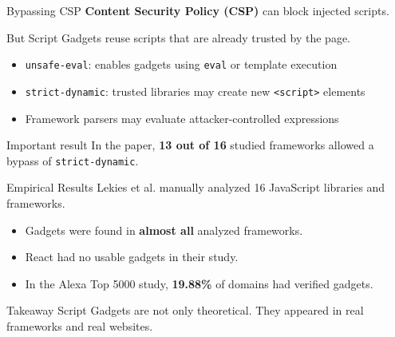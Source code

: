 \documentclass[%
font=nexus,
aspectratio=169,
language=english
]{tubsCD/tubscd}
\begin{document}
\begin{frame}{Bypassing CSP}
\textbf{Content Security Policy (CSP)} can block injected scripts.

\vspace{0.7em}

But Script Gadgets reuse scripts that are already trusted by the page.

\vspace{0.7em}

\begin{itemize}
\item \texttt{unsafe-eval}: enables gadgets using \texttt{eval} or template execution
\item \texttt{strict-dynamic}: trusted libraries may create new \texttt{<script>} elements
\item Framework parsers may evaluate attacker-controlled expressions
\end{itemize}

\vspace{0.7em}

\begin{alertblock}{Important result}
In the paper, \textbf{13 out of 16} studied frameworks allowed a bypass of \texttt{strict-dynamic}.
\end{alertblock}
\end{frame}

\begin{frame}{Empirical Results}
Lekies et al. manually analyzed 16 JavaScript libraries and frameworks.

\vspace{0.7em}

\begin{itemize}
\item Gadgets were found in \textbf{almost all} analyzed frameworks.
\item React had no usable gadgets in their study.
\item In the Alexa Top 5000 study, \textbf{19.88\%} of domains had verified gadgets.
\end{itemize}

\vspace{0.7em}

\begin{block}{Takeaway}
Script Gadgets are not only theoretical. They appeared in real frameworks and real websites.
\end{block}

\small \cite{lekies2017scriptgadgets}
\end{frame}
\end{document}
